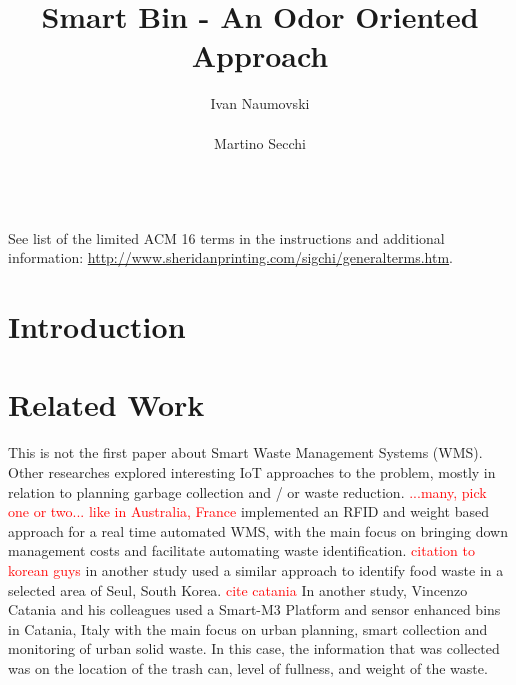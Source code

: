\documentclass{sigchi}
\newcommand\todo[1]{\textcolor{red}{#1}}
\begin{document}
\title{Smart Bin - An Odor Oriented Approach}

\author{
  \alignauthor Ivan Naumovski\\
    \\
  \alignauthor Martino Secchi\\
    \\
}

\maketitle

\begin{abstract}

\end{abstract}





See list of the limited ACM 16 terms in the
instructions and additional information:
\url{http://www.sheridanprinting.com/sigchi/generalterms.htm}.

\section{Introduction}


\section{Related Work}

This is not the first paper about Smart Waste Management Systems (WMS).
Other researches explored interesting IoT approaches to the problem, mostly in relation to planning garbage collection and / or waste reduction.
\todo{...many, pick one or two... like in Australia, France} implemented an RFID and weight  based approach for a real time automated WMS, with the main focus on bringing down management costs and facilitate automating waste identification.
\todo{ citation to korean guys } in another study used a similar approach to identify food waste in a selected area of Seul, South Korea.
\todo{ cite catania} In another study, Vincenzo Catania and his colleagues used a Smart-M3 Platform and sensor enhanced bins in Catania, Italy with the main focus on urban planning, smart collection and  monitoring of urban solid waste. In this case, the information that was collected was on the location of the trash can, level of fullness, and weight of the waste.






\end{document}
